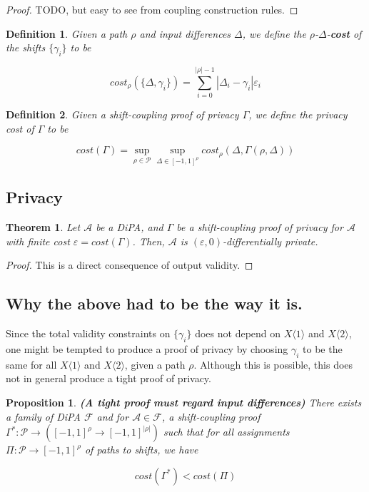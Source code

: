 \documentclass{article}
\newtheorem{theorem}{Theorem}
\newtheorem{proposition}{Proposition}[section]
\newtheorem{definition}{Definition}[section]
\renewcommand{\epsilon}{\varepsilon}
\newcommand{\1}{\langle 1 \rangle}
\newcommand{\2}{\langle 2 \rangle}
\begin{document}
\begin{proof}
    TODO, but easy to see from coupling construction rules.
\end{proof}

\begin{definition}
    Given a path $\rho$ and input differences $\Delta$, we define the $\rho$-$\Delta$-\textbf{cost} of the shifts $\{\gamma_i\}$ to be

    \[cost_{\rho} (\{\Delta, \gamma_i\}) = \sum_{i = 0}^{|\rho| - 1} |\Delta_i - \gamma_i| \epsilon_i\]
\end{definition}

\begin{definition}
    Given a shift-coupling proof of privacy $\Gamma$, we define the privacy cost of $\Gamma$ to be

    \[cost(\Gamma) = \sup_{\rho \in \mathcal{P}} \sup_{\Delta \in [-1, 1]^{\rho}} cost_{\rho}(\Delta, \Gamma(\rho, \Delta))\]
\end{definition}

\subsection{Privacy}

\begin{theorem}
    Let $\mathcal{A}$ be a DiPA, and $\Gamma$ be a shift-coupling proof of privacy for $\mathcal{A}$ with finite cost $\epsilon = cost(\Gamma)$. Then, $\mathcal{A}$ is $(\epsilon, 0)$-differentially private.
\end{theorem}

\begin{proof}
    This is a direct consequence of output validity. 
\end{proof}

\subsection{Why the above had to be the way it is.}

Since the total validity constraints on $\{\gamma_i\}$ does not depend on $X \1$ and $X \2$, one might be tempted to produce a proof of privacy by choosing $\gamma_i$ to be the same for all $X \1$ and $X \2$, given a path $\rho$. Although this is possible, this does not in general produce a tight proof of privacy.

\begin{proposition}
    \textbf{(A tight proof must regard input differences)} There exists a family of DiPA $\mathcal{F}$ and for $\mathcal{A} \in \mathcal{F}$, a shift-coupling proof $\Gamma^*: \mathcal{P} \to ([-1, 1]^{\rho} \to [-1, 1]^{|\rho|})$ such that for all assignments $\Pi: \mathcal{P} \to [-1, 1]^{\rho}$ of paths to shifts, we have 

    \[cost(\Gamma^*) < cost(\Pi)\]
\end{proposition}
\end{document}
